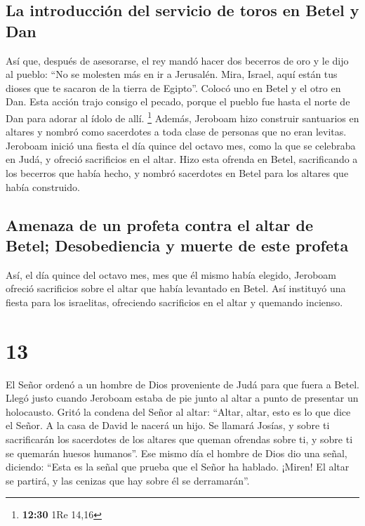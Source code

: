 \hypertarget{la-introducciuxf3n-del-servicio-de-toros-en-betel-y-dan}{%
\subsection{La introducción del servicio de toros en Betel y
Dan}\label{la-introducciuxf3n-del-servicio-de-toros-en-betel-y-dan}}

 Así que, después de asesorarse, el rey mandó hacer dos
becerros de oro y le dijo al pueblo: ``No se molesten más en ir a
Jerusalén. Mira, Israel, aquí están tus dioses que te sacaron de la
tierra de Egipto''.  Colocó uno en Betel y el otro en
Dan.  Esta acción trajo consigo el pecado, porque el
pueblo fue hasta el norte de Dan para adorar al ídolo de allí.
\footnote{\textbf{12:30} 1Re 14,16}  Además, Jeroboam
hizo construir santuarios en altares y nombró como sacerdotes a toda
clase de personas que no eran levitas.  Jeroboam inició
una fiesta el día quince del octavo mes, como la que se celebraba en
Judá, y ofreció sacrificios en el altar. Hizo esta ofrenda en Betel,
sacrificando a los becerros que había hecho, y nombró sacerdotes en
Betel para los altares que había construido.

\hypertarget{amenaza-de-un-profeta-contra-el-altar-de-betel-desobediencia-y-muerte-de-este-profeta}{%
\subsection{Amenaza de un profeta contra el altar de Betel;
Desobediencia y muerte de este
profeta}\label{amenaza-de-un-profeta-contra-el-altar-de-betel-desobediencia-y-muerte-de-este-profeta}}

 Así, el día quince del octavo mes, mes que él mismo
había elegido, Jeroboam ofreció sacrificios sobre el altar que había
levantado en Betel. Así instituyó una fiesta para los israelitas,
ofreciendo sacrificios en el altar y quemando incienso.

\hypertarget{section-12}{%
\section{13}\label{section-12}}

 El Señor ordenó a un hombre de Dios proveniente de Judá
para que fuera a Betel. Llegó justo cuando Jeroboam estaba de pie junto
al altar a punto de presentar un holocausto.  Gritó la
condena del Señor al altar: ``Altar, altar, esto es lo que dice el
Señor. A la casa de David le nacerá un hijo. Se llamará Josías, y sobre
ti sacrificarán los sacerdotes de los altares que queman ofrendas sobre
ti, y sobre ti se quemarán huesos humanos''.  Ese mismo
día el hombre de Dios dio una señal, diciendo: ``Esta es la señal que
prueba que el Señor ha hablado. ¡Miren! El altar se partirá, y las
cenizas que hay sobre él se derramarán''.

